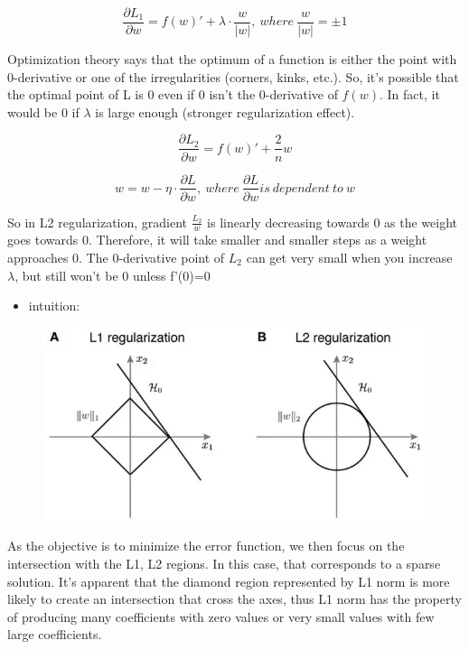 \documentclass[11pt]{article}
\makeatletter
\def\maxwidth{\ifdim\Gin@nat@width>\linewidth\linewidth
    \else\Gin@nat@width\fi}
\let\Oldincludegraphics\includegraphics
\renewcommand{\includegraphics}[1]{\Oldincludegraphics[width=.8\maxwidth]{#1}}
\providecommand{\tightlist}{%
      \setlength{\itemsep}{0pt}\setlength{\parskip}{0pt}}
\makeatother
\begin{document}
\[\frac{\partial L_1}{\partial w} = f(w)' + \lambda \cdot \frac{w}{|w|}, \: where \: \frac{w}{|w|} = \pm 1\]

Optimization theory says that the optimum of a function is either the point with 0-derivative or one of the irregularities (corners, kinks, etc.). So, it's possible that the optimal point of L is 0 even if 0 isn't the 0-derivative of \(f(w)\). In fact, it would be 0 if \(\lambda\) is large enough (stronger regularization effect). 

\[\frac{\partial L_2}{\partial w} = f(w)' + \frac{2}{n} w\]

\[w = w - \eta \cdot \frac{\partial L}{\partial w}, \: where \: \frac{\partial L}{\partial w}  is \: dependent \: to \: w\]

So in L2 regularization, gradient \(\frac{L_2}{w}\) is linearly
decreasing towards 0 as the weight goes towards 0. Therefore, it will
take smaller and smaller steps as a weight approaches 0.
 The 0-derivative point of \(L_2\) can get very small when you increase \(\lambda\), but still won't be 0 unless  f'(0)=0

\begin{itemize}
\tightlist
\item
  intuition:
\end{itemize}

\begin{figure}[H]
\centering
\includegraphics{l1l2.png}
\caption{}
\end{figure}

As the objective is to minimize the error function,
we then focus on the intersection with the L1, L2
regions.  In this case, that corresponds to a sparse solution. It's apparent that the diamond region represented by L1 norm is
more likely to create an intersection that cross the axes, thus L1 norm has the property of producing many coefficients with zero values or very small values with few large coefficients. 


    
    
    
    
\end{document}
